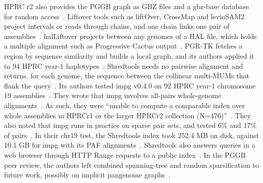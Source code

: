 HPRC r2 also provides the PGGB graph as GBZ files and a gbz-base database for random access~\citep{Siren2022gbz,Siren2026gbzbase}.
Liftover tools such as liftOver, CrossMap and levioSAM2 project intervals or reads through chains, and one chain links one pair of assemblies~\citep{Kent2003chain,Kuhn2013ucsc,Zhao2014crossmap,Chen2024leviosam2}.
halLiftover projects between any genomes of a HAL file, which holds a multiple alignment such as Progressive Cactus output~\citep{Hickey2013hal,Armstrong2020cactus}.
PGR-TK fetches a region by sequence similarity and builds a local graph, and its authors applied it to 94 HPRC year-1 haplotypes~\citep{Chin2023pgrtk}.
Shredtools needs no pairwise alignment and returns, for each genome, the sequence between the collinear multi-MUMs that flank the query~\citep{Shivakumar2026shredtools,Shivakumar2025mumemto}.
Its authors tested impg v0.4.0 on 92 HPRC year-1 chromosome 19 assemblies~\citep{Shivakumar2026shredtools,Liao2023hprc}.
They wrote that impg involves all-pairs whole-genome alignments~\citep{Shivakumar2026shredtools}.
As such, they were ``unable to compute a comparable index over whole assemblies in HPRCr1 or the larger HPRCr2 collection (N=476)''~\citep{Shivakumar2026shredtools}.
They also noted that impg runs in practice on sparse pair sets, and tested 6\% and 17\% of pairs~\citep{Shivakumar2026shredtools}.
In their chr19 test, the Shredtools index took 252.4 MB on disk, against 10.1 GB for impg with its PAF alignments~\citep{Shivakumar2026shredtools}.
Shredtools also answers queries in a web browser through HTTP Range requests to a public index~\citep{Shivakumar2026shredtools}.
In the PGGB peer review, the authors left combined spanning-tree and random sparsification to future work, possibly on implicit pangenome graphs~\citep{Garrison2024pggb}.

